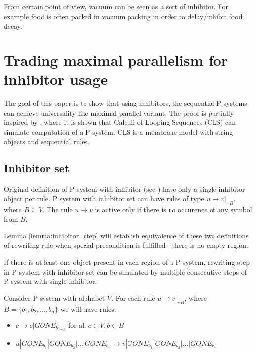 \documentclass[a4paper,10pt]{article}
\begin{document}
From certain point of view, vacuum can be seen as a sort of inhibitor. For example food is often packed in vacuum packing in order to delay/inhibit food decay.

\section{Trading maximal parallelism for inhibitor usage}
\label{sec:inhibitors}
The goal of this paper is to show that using inhibitors, the sequential P systems can achieve universality like maximal parallel variant. The proof is partially inspired by \cite{Barbuti07thecalculus}, where it is shown that Calculi of Looping Sequences (CLS) can simulate computation of a P system. CLS is a membrane model with string objects and sequential rules.

\subsection{Inhibitor set}
Original definition of P system with inhibitor (see \cite{Ionescu:jucs_10_5:on_p_systems_with}) have only a single inhibitor object per rule. P system with inhibitor set can have rules of type $u\rightarrow v|_{\neg B}$, where $B\subseteq V$. The rule $u\rightarrow v$ is active only if there is no occurence of any symbol from $B$.

Lemma \ref{lemma:inhibitor_step} will establish equivalence of these two definitions of rewriting rule when special precondition is fulfilled - there is no empty region.

\begin{lema}
\label{lemma:inhibitor_step}
  If there is at least one object present in each region of a P system, rewriting step in P system with inhibitor set can be simulated by multiple consecutive steps of P system with single inhibitor.
\end{lema}

\begin{dokaz}
  Consider P system with alphabet $V$.
  For each rule $u\rightarrow v|_{\neg B}$, where $B=\{b_1, b_2, \dots ,b_n\}$ we will have rules:
  \begin{itemize}
    \item $c \rightarrow c|GONE_{b}|_{\neg b}$ for all $ c\in V, b\in B$
    \item $u|GONE_{b_1}|GONE_{b_2}|\dots|GONE_{b_n} \rightarrow v|GONE_{b_1}|GONE_{b_2}|\dots|GONE_{b_n}$
  \end{itemize}
\end{dokaz}
\end{document}
